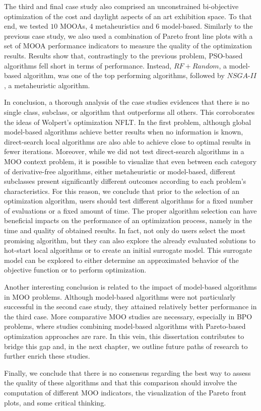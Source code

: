 The third and final case study also comprised an unconstrained bi-objective optimization of the cost and daylight aspects of an art exhibition space. To that end, we tested $10$ \acp{MOOA}, $4$ metaheuristics and $6$ model-based. Similarly to the previous case study, we also used a combination of Pareto front line plots with a set of \ac{MOOA} performance indicators to measure the quality of the optimization results. Results show that, contrastingly to the previous problem, \ac{PSO}-based algorithms fell short in terms of performance. Instead, $RF+Random$, a model-based algorithm, was one of the top performing algorithms, followed by $NSGA$-$II$, a metaheuristic algorithm. 

In conclusion, a thorough analysis of the case studies evidences that there is no single class, subclass, or algorithm that outperforms all others. This corroborates the ideas of Wolpert's optimization \ac{NFLT}\cite{Wolpert1997NFLT}. In the first problem, although global model-based algorithms achieve better results when no information is known, direct-search local algorithms are also able to achieve close to optimal results in fewer iterations. Moreover, while we did not test direct-search algorithms in a \ac{MOO} context problem, it is possible to visualize that even between each category of derivative-free algorithms, either metaheuristic or model-based, different subclasses present significantly different outcomes according to each problem's characteristics. For this reason, we conclude that prior to the selection of an optimization algorithm, users should test different algorithms for a fixed number of evaluations or a fixed amount of time. The proper algorithm selection can have beneficial impacts on the performance of an optimization process, namely in the time and quality of obtained results. In fact, not only do users select the most promising algorithm, but they can also explore the already evaluated solutions to hot-start local algorithms or to create an initial surrogate model. This surrogate model can be explored to either determine an approximated behavior of the objective function or to perform optimization. 

Another interesting conclusion is related to the impact of model-based algorithms in \ac{MOO} problems. Although model-based algorithms were not particularly successful in the second case study, they attained relatively better performance in the third case. More comparative \ac{MOO} studies are necessary, especially in \ac{BPO} problems, where studies combining model-based algorithms with Pareto-based optimization approaches are rare. In this vein, this dissertation contributes to bridge this gap and, in the next chapter, we outline future paths of research to further enrich these studies.

Finally, we conclude that there is no consensus regarding the best way to assess the quality of these algorithms and that this comparison should involve the computation of different \ac{MOO} indicators, the visualization of the Pareto front plots, and some critical thinking. 